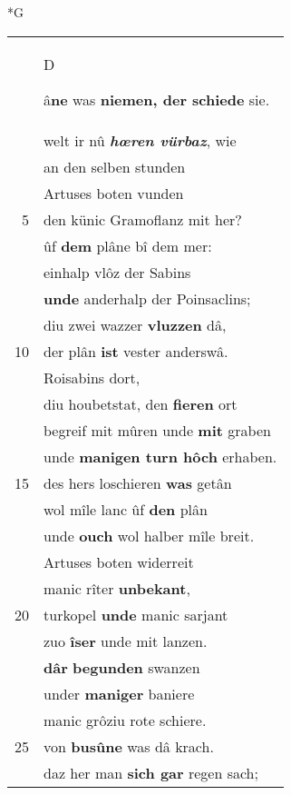 \documentclass[8pt,a4paper,notitlepage]{article}
\begin{document}
\begin{table}[ht]
\begin{minipage}[t]{0.5\linewidth}
\end{minipage}
\end{table}
\newpage
\begin{table}[ht]
\begin{minipage}[t]{0.5\linewidth}
\small
\begin{center}*G
\end{center}
\begin{tabular}{rl}
 & \begin{large}D\end{large}â\textbf{ne} was \textbf{niemen, der schiede} sie.\\ 
 & welt ir nû \textit{\textbf{hœren vürbaz}}, wie\\ 
 & an den selben stunden\\ 
 & Artuses boten vunden\\ 
5 & den künic Gramoflanz mit her?\\ 
 & ûf \textbf{dem} plâne bî dem mer:\\ 
 & einhalp vlôz der Sabins\\ 
 & \textbf{unde} anderhalp der Poinsaclins;\\ 
 & diu zwei wazzer \textbf{vluzzen} dâ,\\ 
10 & der plân \textbf{ist} vester anderswâ.\\ 
 & Roisabins dort,\\ 
 & diu houbetstat, den \textbf{fieren} ort\\ 
 & begreif mit mûren unde \textbf{mit} graben\\ 
 & unde \textbf{manigen turn hôch} erhaben.\\ 
15 & des hers loschieren \textbf{was} getân\\ 
 & wol mîle lanc ûf \textbf{den} plân\\ 
 & unde \textbf{ouch} wol halber mîle breit.\\ 
 & Artuses boten widerreit\\ 
 & manic rîter \textbf{unbekant},\\ 
20 & turkopel \textbf{unde} manic sarjant\\ 
 & zuo \textbf{îser} unde mit lanzen.\\ 
 & \textbf{dâr} \textbf{begunden} swanzen\\ 
 & under \textbf{maniger} baniere\\ 
 & manic grôziu rote schiere.\\ 
25 & von \textbf{busûne} was dâ krach.\\ 
 & daz her man \textbf{sich gar} regen sach;\\ 

\end{tabular}
\end{minipage}
\end{table}
\end{document}
